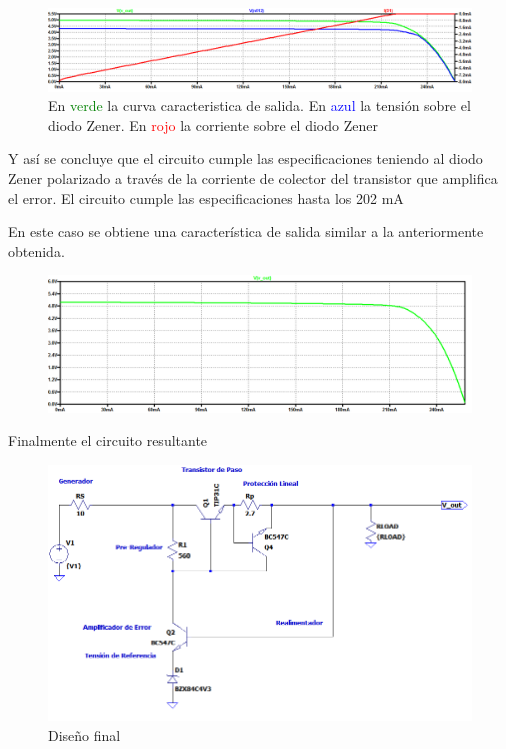 \begin{figure}[H]
	\centering
	\includegraphics[width=\linewidth]{ImagenesEjercicio1/SinRpz3curvas}
	\caption{En \textcolor{green}{verde} la curva caracteristica de salida. En \textcolor{blue}{azul} la tensión sobre el diodo Zener. En \textcolor{red}{rojo} la corriente sobre el diodo Zener}
	\label{fig:sinrpz3curvas}
\end{figure}

Y así se concluye que el circuito cumple las especificaciones teniendo al diodo Zener polarizado a través
de la corriente de colector del transistor que amplifica el error.
El circuito cumple las especificaciones hasta los 202 mA

En este caso se obtiene una característica de salida similar a la anteriormente obtenida.
\begin{figure}[H]
	\centering
	\includegraphics[width=\linewidth]{ImagenesEjercicio1/CaracteristicaDeSalidaConGrillaFL}
	\caption{}
	\label{fig:caracteristicadesalidacongrillafl}
\end{figure} 
Finalmente el circuito resultante
\begin{figure}[H]
	\centering
	\includegraphics[width=0.7\linewidth]{ImagenesEjercicio1/ImagenCircuitoFL}
	\caption{Diseño final}
	\label{fig:imagencircuitofl}
\end{figure}



